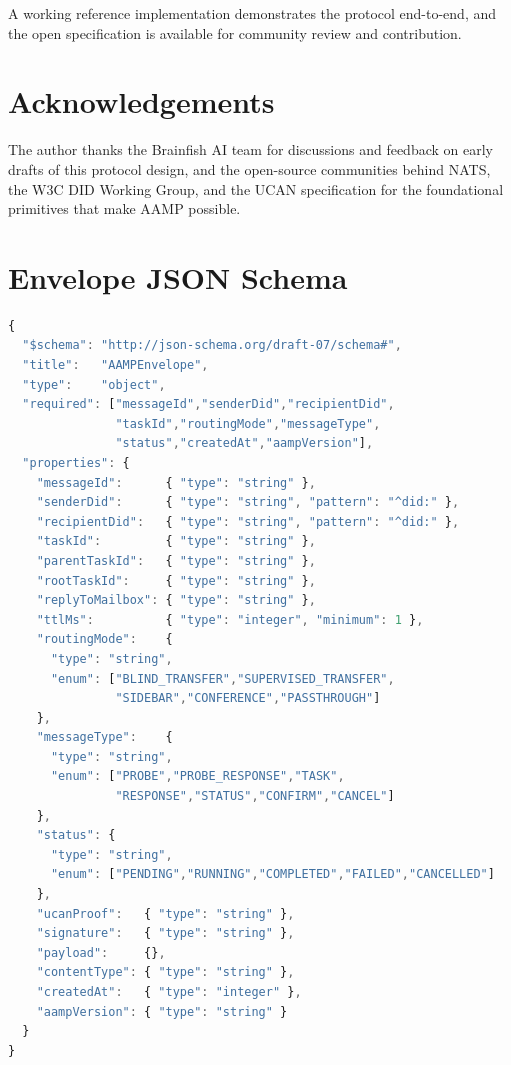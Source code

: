 \documentclass[11pt,a4paper]{article}
\begin{document}
A working reference implementation demonstrates the protocol end-to-end, and the
open specification is available for community review and contribution.

\section*{Acknowledgements}
The author thanks the Brainfish AI team for discussions and feedback on early drafts
of this protocol design, and the open-source communities behind NATS, the W3C DID
Working Group, and the UCAN specification for the foundational primitives that
make AAMP possible.




\appendix

\section{Envelope JSON Schema}
\label{app:schema}

\begin{lstlisting}[language=JavaScript,caption={Minimal Envelope JSON Schema (draft-07).},numbers=none]
{
  "$schema": "http://json-schema.org/draft-07/schema#",
  "title":   "AAMPEnvelope",
  "type":    "object",
  "required": ["messageId","senderDid","recipientDid",
               "taskId","routingMode","messageType",
               "status","createdAt","aampVersion"],
  "properties": {
    "messageId":      { "type": "string" },
    "senderDid":      { "type": "string", "pattern": "^did:" },
    "recipientDid":   { "type": "string", "pattern": "^did:" },
    "taskId":         { "type": "string" },
    "parentTaskId":   { "type": "string" },
    "rootTaskId":     { "type": "string" },
    "replyToMailbox": { "type": "string" },
    "ttlMs":          { "type": "integer", "minimum": 1 },
    "routingMode":    {
      "type": "string",
      "enum": ["BLIND_TRANSFER","SUPERVISED_TRANSFER",
               "SIDEBAR","CONFERENCE","PASSTHROUGH"]
    },
    "messageType":    {
      "type": "string",
      "enum": ["PROBE","PROBE_RESPONSE","TASK",
               "RESPONSE","STATUS","CONFIRM","CANCEL"]
    },
    "status": {
      "type": "string",
      "enum": ["PENDING","RUNNING","COMPLETED","FAILED","CANCELLED"]
    },
    "ucanProof":   { "type": "string" },
    "signature":   { "type": "string" },
    "payload":     {},
    "contentType": { "type": "string" },
    "createdAt":   { "type": "integer" },
    "aampVersion": { "type": "string" }
  }
}
\end{lstlisting}
\end{document}
